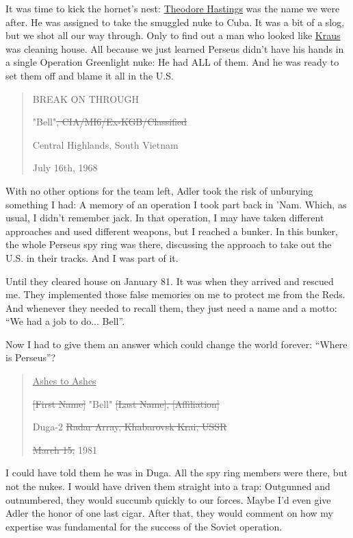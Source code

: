 \documentclass{article}
\begin{document}
It was time to kick the hornet's nest: \href{https://callofduty.fandom.com/wiki/Theodore_Hastings}{Theodore Hastings} was the name we were after. He was assigned to take the smuggled nuke to Cuba. It was a bit of a slog, but we shot all our way through. Only to find out a man who looked like \href{https://callofduty.fandom.com/wiki/Perseus_(Cold_War)?so=search}{Kraus} was cleaning house. All because we just learned Perseus didn't have his hands in a single Operation Greenlight nuke: He had ALL of them. And he was ready to set them off and blame it all in the U.S.

\begin{quote}
    BREAK ON THROUGH
    
    "Bell"\sout{, CIA/MI6/Ex-KGB/Classified}
    
    Central Highlands, South Vietnam
    
    July 16th, 1968
\end{quote}

With no other options for the team left, Adler took the risk of unburying something I had: A memory of an operation I took part back in 'Nam. Which, as usual, I didn't remember jack. In that operation, I may have taken different approaches and used different weapons, but I reached a bunker. In this bunker, the whole Perseus spy ring was there, discussing the approach to take out the U.S. in their tracks. And I was part of it.

Until they cleared house on January 81. It was when they arrived and rescued me. They implemented those false memories on me to protect me from the Reds. And whenever they needed to recall them, they just need a name and a motto:
“We had a job to do... Bell”.

Now I had to give them an answer which could change the world forever:
“Where is Perseus”?

\begin{quote}
    \underline{Ashes to Ashes}
    
    \sout{[First Name]} "Bell" \sout{[Last Name], [Affiliation]}
    
    Duga-2 \sout{Radar Array, Khabarovsk Krai, USSR}
    
    \sout{March 15,} 1981
\end{quote}

I could have told them he was in Duga. All the spy ring members were there, but not the nukes. I would have driven them straight into a trap: Outgunned and outnumbered, they would succumb quickly to our forces. Maybe I'd even give Adler the honor of one last cigar. After that, they would comment on how my expertise was fundamental for the success of the Soviet operation.
\end{document}
